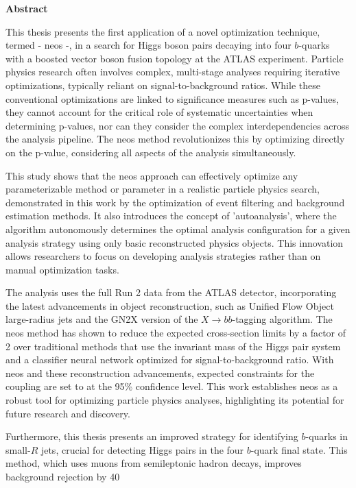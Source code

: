 \begin{center}
\textbf{Abstract}
\end{center}
\noindent This thesis presents the first application of a novel optimization technique, termed - \acf{neos} -, in a search for Higgs boson pairs decaying into four $b$-quarks with a boosted vector boson fusion topology at the ATLAS experiment. Particle physics research often involves complex, multi-stage analyses requiring iterative optimizations, typically reliant on signal-to-background ratios. While these conventional optimizations are linked to significance measures such as p-values, they cannot account for the critical role of systematic uncertainties when determining p-values, nor can they consider the complex interdependencies across the analysis pipeline. The \ac{neos} method revolutionizes this by optimizing directly on the p-value, considering all aspects of the analysis simultaneously.

This study shows that the \ac{neos} approach can effectively optimize any parameterizable method or parameter in a realistic particle physics search, demonstrated in this work by the optimization of event filtering and background estimation methods. It also introduces the concept of 'autoanalysis', where the algorithm autonomously determines the optimal analysis configuration for a given analysis strategy using only basic reconstructed physics objects. This innovation allows researchers to focus on developing analysis strategies rather than on manual optimization tasks.

The analysis uses the full Run 2 data from the ATLAS detector, incorporating the latest advancements in object reconstruction, such as Unified Flow Object large-radius jets and the GN2X version of the $X\rightarrow bb$-tagging algorithm. The \ac{neos} method has shown to reduce the expected cross-section limits by a factor of 2 over traditional methods that use the invariant mass of the Higgs pair system and a classifier neural network optimized for signal-to-background ratio. With \ac{neos} and these reconstruction advancements, expected constraints for the \ktwov coupling are set to  at the 95\% confidence level. This work establishes \ac{neos} as a robust tool for optimizing particle physics analyses, highlighting its potential for future research and discovery.

Furthermore, this thesis presents an improved strategy for identifying $b$-quarks in small-$R$ jets, crucial for detecting Higgs pairs in the four $b$-quark final state. This method, which uses muons from semileptonic hadron decays, improves background rejection by 40%





